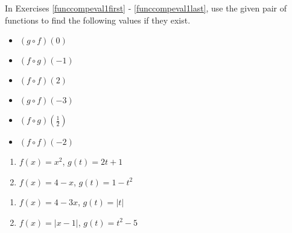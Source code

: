 \documentclass{ximera}
\begin{document}
	\author{Stitz-Zeager}


\label{ExercisesforFunctionComposition}


In Exercises \ref{funccompeval1first} - \ref{funccompeval1last}, use the given pair of functions to find the following values if they exist.

\begin{multicols}{3}

\begin{itemize}

\item  $(g\circ f)(0)$

\item  $(f\circ g)(-1)$

\item  $(f \circ f)(2)$

\end{itemize}

\end{multicols}

\begin{multicols}{3}

\begin{itemize}

\item  $(g\circ f)(-3)$

\item  $(f\circ g)\left(\frac{1}{2}\right)$

\item  $(f \circ f)(-2)$

\end{itemize}

\end{multicols}

\begin{multicols}{2}
\begin{enumerate}

\item  $f(x) = x^2$, $g(t) = 2t+1$ \label{funccompeval1first}
\item  $f(x) = 4-x$, $g(t) = 1-t^2$

\setcounter{HW}{\value{enumi}}
\end{enumerate}
\end{multicols}

\begin{multicols}{2}
\begin{enumerate}
\setcounter{enumi}{\value{HW}}

\item  $f(x) = 4-3x$, $g(t) = |t|$
\item  $f(x) = |x-1|$, $g(t) = t^2-5$

\setcounter{HW}{\value{enumi}}
\end{enumerate}
\end{multicols}
\end{document}
